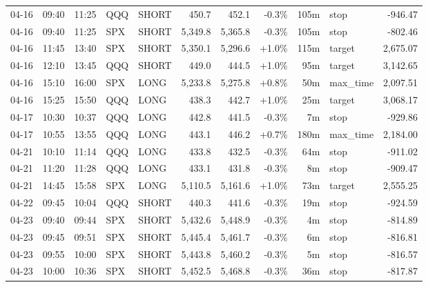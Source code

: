 \documentclass[11pt,a4paper,twoside]{article}
\begin{document}
\begin{center}
\begin{longtable}{>{\color{txtmain}}l l l l l r r r r >{\color{txtmain}}l r}
04-16 & 09:40 & 11:25 & QQQ & SHORT & 450.7 & 452.1 & \textcolor{lossred}{-0.3\%} & 105m & stop & \textcolor{lossred}{-946.47} \\
04-16 & 09:40 & 11:25 & SPX & SHORT & 5,349.8 & 5,365.8 & \textcolor{lossred}{-0.3\%} & 105m & stop & \textcolor{lossred}{-802.46} \\
04-16 & 11:45 & 13:40 & SPX & SHORT & 5,350.1 & 5,296.6 & \textcolor{wingreen}{+1.0\%} & 115m & target & \textcolor{wingreen}{2,675.07} \\
04-16 & 12:10 & 13:45 & QQQ & SHORT & 449.0 & 444.5 & \textcolor{wingreen}{+1.0\%} & 95m & target & \textcolor{wingreen}{3,142.65} \\
04-16 & 15:10 & 16:00 & SPX & LONG & 5,233.8 & 5,275.8 & \textcolor{wingreen}{+0.8\%} & 50m & max\_time & \textcolor{wingreen}{2,097.51} \\
04-16 & 15:25 & 15:50 & QQQ & LONG & 438.3 & 442.7 & \textcolor{wingreen}{+1.0\%} & 25m & target & \textcolor{wingreen}{3,068.17} \\
04-17 & 10:30 & 10:37 & QQQ & LONG & 442.8 & 441.5 & \textcolor{lossred}{-0.3\%} & 7m & stop & \textcolor{lossred}{-929.86} \\
04-17 & 10:55 & 13:55 & QQQ & LONG & 443.1 & 446.2 & \textcolor{wingreen}{+0.7\%} & 180m & max\_time & \textcolor{wingreen}{2,184.00} \\
04-21 & 10:10 & 11:14 & QQQ & LONG & 433.8 & 432.5 & \textcolor{lossred}{-0.3\%} & 64m & stop & \textcolor{lossred}{-911.02} \\
04-21 & 11:20 & 11:28 & QQQ & LONG & 433.1 & 431.8 & \textcolor{lossred}{-0.3\%} & 8m & stop & \textcolor{lossred}{-909.47} \\
04-21 & 14:45 & 15:58 & SPX & LONG & 5,110.5 & 5,161.6 & \textcolor{wingreen}{+1.0\%} & 73m & target & \textcolor{wingreen}{2,555.25} \\
04-22 & 09:45 & 10:04 & QQQ & SHORT & 440.3 & 441.6 & \textcolor{lossred}{-0.3\%} & 19m & stop & \textcolor{lossred}{-924.59} \\
04-23 & 09:40 & 09:44 & SPX & SHORT & 5,432.6 & 5,448.9 & \textcolor{lossred}{-0.3\%} & 4m & stop & \textcolor{lossred}{-814.89} \\
04-23 & 09:45 & 09:51 & SPX & SHORT & 5,445.4 & 5,461.7 & \textcolor{lossred}{-0.3\%} & 6m & stop & \textcolor{lossred}{-816.81} \\
04-23 & 09:55 & 10:00 & SPX & SHORT & 5,443.8 & 5,460.2 & \textcolor{lossred}{-0.3\%} & 5m & stop & \textcolor{lossred}{-816.57} \\
04-23 & 10:00 & 10:36 & SPX & SHORT & 5,452.5 & 5,468.8 & \textcolor{lossred}{-0.3\%} & 36m & stop & \textcolor{lossred}{-817.87} \\

\end{longtable}
\end{center}
\end{document}
